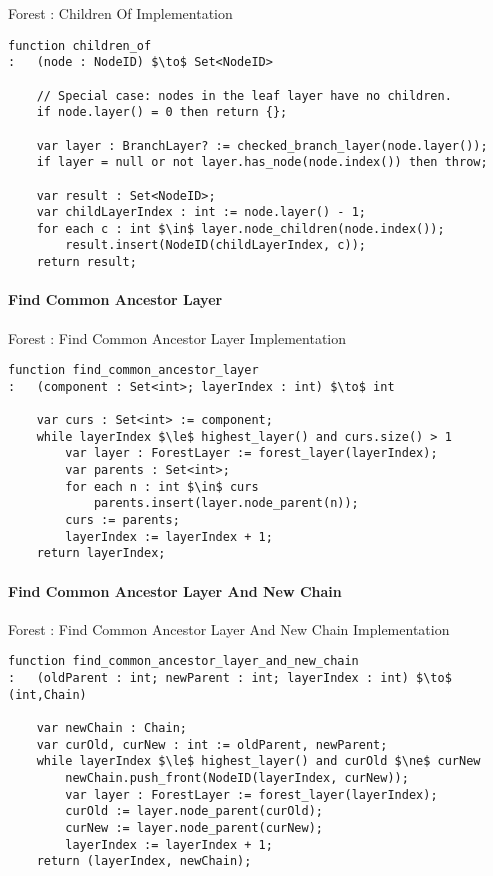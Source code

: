 \begin{stulisting}[H]
\caption{Forest : Children Of Implementation}
\begin{lstlisting}[style=Default]
function children_of
:	(node : NodeID) $\to$ Set<NodeID>

	// Special case: nodes in the leaf layer have no children.
	if node.layer() = 0 then return {};

	var layer : BranchLayer? := checked_branch_layer(node.layer());
	if layer = null or not layer.has_node(node.index()) then throw;

	var result : Set<NodeID>;
	var childLayerIndex : int := node.layer() - 1;
	for each c : int $\in$ layer.node_children(node.index());
		result.insert(NodeID(childLayerIndex, c));
	return result;
\end{lstlisting}
\end{stulisting}

\paragraph{Find Common Ancestor Layer}

\begin{stulisting}[H]
\caption{Forest : Find Common Ancestor Layer Implementation}
\begin{lstlisting}[style=Default]
function find_common_ancestor_layer
:	(component : Set<int>; layerIndex : int) $\to$ int

	var curs : Set<int> := component;
	while layerIndex $\le$ highest_layer() and curs.size() > 1
		var layer : ForestLayer := forest_layer(layerIndex);
		var parents : Set<int>;
		for each n : int $\in$ curs
			parents.insert(layer.node_parent(n));
		curs := parents;
		layerIndex := layerIndex + 1;
	return layerIndex;
\end{lstlisting}
\end{stulisting}

\paragraph{Find Common Ancestor Layer And New Chain}

\begin{stulisting}[H]
\caption{Forest : Find Common Ancestor Layer And New Chain Implementation}
\begin{lstlisting}[style=Default]
function find_common_ancestor_layer_and_new_chain
:	(oldParent : int; newParent : int; layerIndex : int) $\to$ (int,Chain)

	var newChain : Chain;
	var curOld, curNew : int := oldParent, newParent;
	while layerIndex $\le$ highest_layer() and curOld $\ne$ curNew
		newChain.push_front(NodeID(layerIndex, curNew));
		var layer : ForestLayer := forest_layer(layerIndex);
		curOld := layer.node_parent(curOld);
		curNew := layer.node_parent(curNew);
		layerIndex := layerIndex + 1;
	return (layerIndex, newChain);
\end{lstlisting}
\end{stulisting}


